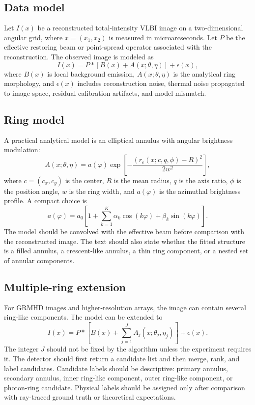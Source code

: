 \documentclass[11pt]{article}
\begin{document}
\subsection{Data model}
Let $I(x)$ be a reconstructed total-intensity VLBI image on a two-dimensional angular grid, where $x=(x_1,x_2)$ is measured in microarcseconds. Let $P$ be the effective restoring beam or point-spread operator associated with the reconstruction. The observed image is modeled as
\begin{equation}
    I(x) = P \ast \left[B(x) + A(x;\theta,\eta)\right] + \epsilon(x),
\end{equation}
where $B(x)$ is local background emission, $A(x;\theta,\eta)$ is the analytical ring morphology, and $\epsilon(x)$ includes reconstruction noise, thermal noise propagated to image space, residual calibration artifacts, and model mismatch.

\subsection{Ring model}
A practical analytical model is an elliptical annulus with angular brightness modulation:
\begin{equation}
    A(x;\theta,\eta) = a(\varphi) \exp\left[-\frac{(r_e(x;c,q,\phi)-R)^2}{2w^2}\right],
\end{equation}
where $c=(c_x,c_y)$ is the center, $R$ is the mean radius, $q$ is the axis ratio, $\phi$ is the position angle, $w$ is the ring width, and $a(\varphi)$ is the azimuthal brightness profile. A compact choice is
\begin{equation}
    a(\varphi)=a_0\left[1+\sum_{k=1}^{K}\alpha_k\cos(k\varphi)+\beta_k\sin(k\varphi)\right].
\end{equation}
The model should be convolved with the effective beam before comparison with the reconstructed image. The text should also state whether the fitted structure is a filled annulus, a crescent-like annulus, a thin ring component, or a nested set of annular components.

\subsection{Multiple-ring extension}
For GRMHD images and higher-resolution arrays, the image can contain several ring-like components. The model can be extended to
\begin{equation}
    I(x)=P\ast\left[B(x)+\sum_{j=1}^{J} A_j(x;\theta_j,\eta_j)\right]+\epsilon(x).
\end{equation}
The integer $J$ should not be fixed by the algorithm unless the experiment requires it. The detector should first return a candidate list and then merge, rank, and label candidates. Candidate labels should be descriptive: primary annulus, secondary annulus, inner ring-like component, outer ring-like component, or photon-ring candidate. Physical labels should be assigned only after comparison with ray-traced ground truth or theoretical expectations.
\end{document}
